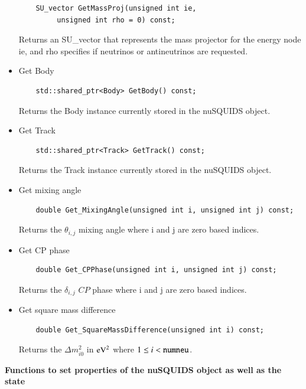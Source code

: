 \documentclass[3p,12pt]{elsarticle}
\newcommand{\ttf}{\ttfamily}
\begin{document}
\begin{itemize}
\begin{lstlisting}
    SU_vector GetMassProj(unsigned int ie,
         unsigned int rho = 0) const;
  \end{lstlisting}
  Returns an {\ttf SU\_vector} that represents the mass projector for the energy node {\ttf ie}, and 
  {\ttf rho} specifies if neutrinos or antineutrinos are requested.
  \item Get {\ttfamily Body}
  \begin{lstlisting}
    std::shared_ptr<Body> GetBody() const;
  \end{lstlisting}
  Returns the {\ttf Body} instance currently stored in the {\ttf nuSQUIDS} object.
  \item Get {\ttfamily Track}
  \begin{lstlisting}
    std::shared_ptr<Track> GetTrack() const;
  \end{lstlisting}
  Returns the {\ttf Track} instance currently stored in the {\ttf nuSQUIDS} object.
  \item Get mixing angle
  \begin{lstlisting}
    double Get_MixingAngle(unsigned int i, unsigned int j) const;
  \end{lstlisting}
  Returns the $\theta_{i,j}$ mixing angle where {\ttf i} and {\ttf j} are zero based indices.
  \item Get CP phase
  \begin{lstlisting}
    double Get_CPPhase(unsigned int i, unsigned int j) const;
  \end{lstlisting}
  Returns the $\delta_{i,j}$ $CP$ phase where {\ttf i} and {\ttf j} are zero based indices.
  \item Get square mass difference
  \begin{lstlisting}
    double Get_SquareMassDifference(unsigned int i) const;
  \end{lstlisting}
  Returns the $\Delta m^2_{i0}$ in ${\rm eV}^2$ where $1\le i < {\rm \tt numneu}$.
  \end{itemize}
  
\textbf{Functions to set properties of the nuSQUIDS object as well as the state}
\end{document}
